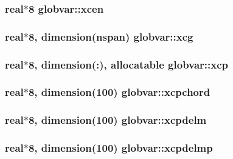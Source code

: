 \subsubsection[{xcen}]{\setlength{\rightskip}{0pt plus 5cm}real$\ast$8 globvar\+::xcen}\label{namespaceglobvar_afe183ce32de3adfc403b0f269a275676}
\hypertarget{namespaceglobvar_a7e4a1b87658252043b32443ffafb3ddf}{}
\subsubsection[{xcg}]{\setlength{\rightskip}{0pt plus 5cm}real$\ast$8, dimension({\bf nspan}) globvar\+::xcg}\label{namespaceglobvar_a7e4a1b87658252043b32443ffafb3ddf}
\hypertarget{namespaceglobvar_a2261b8999031669b2d4002de587e1017}{}
\subsubsection[{xcp}]{\setlength{\rightskip}{0pt plus 5cm}real$\ast$8, dimension(\+:), allocatable globvar\+::xcp}\label{namespaceglobvar_a2261b8999031669b2d4002de587e1017}
\hypertarget{namespaceglobvar_a7d3222448b640704a89fa6cdc07a4331}{}
\subsubsection[{xcpchord}]{\setlength{\rightskip}{0pt plus 5cm}real$\ast$8, dimension(100) globvar\+::xcpchord}\label{namespaceglobvar_a7d3222448b640704a89fa6cdc07a4331}
\hypertarget{namespaceglobvar_a7da205f9d2f93c70b889e9da9c9ac03a}{}
\subsubsection[{xcpdelm}]{\setlength{\rightskip}{0pt plus 5cm}real$\ast$8, dimension(100) globvar\+::xcpdelm}\label{namespaceglobvar_a7da205f9d2f93c70b889e9da9c9ac03a}
\hypertarget{namespaceglobvar_ad1fdc8c08d0045d1d9088325d56d0a7f}{}
\subsubsection[{xcpdelmp}]{\setlength{\rightskip}{0pt plus 5cm}real$\ast$8, dimension(100) globvar\+::xcpdelmp}\label{namespaceglobvar_ad1fdc8c08d0045d1d9088325d56d0a7f}
\hypertarget{namespaceglobvar_a53a66282b3eaeda7202704473994f279}{}
